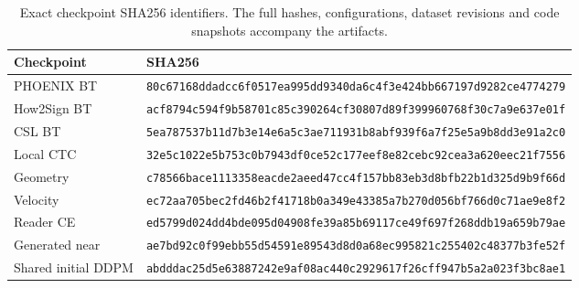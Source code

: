 \begin{table}[t]\centering\small
\caption{Exact checkpoint SHA256 identifiers. The full hashes, configurations, dataset revisions and code snapshots accompany the artifacts.}\label{tab:hashes}
\begin{tabular}{ll}\toprule
Checkpoint & SHA256\\\midrule
PHOENIX BT & \texttt{80c67168ddadcc6f0517ea995dd9340da6c4f3e424bb667197d9282ce4774279}\\
How2Sign BT & \texttt{acf8794c594f9b58701c85c390264cf30807d89f399960768f30c7a9e637e01f}\\
CSL BT & \texttt{5ea787537b11d7b3e14e6a5c3ae711931b8abf939f6a7f25e5a9b8dd3e91a2c0}\\
Local CTC & \texttt{32e5c1022e5b753c0b7943df0ce52c177eef8e82cebc92cea3a620eec21f7556}\\
Geometry & \texttt{c78566bace1113358eacde2aeed47cc4f157bb83eb3d8bfb22b1d325d9b9f66d}\\
Velocity & \texttt{ec72aa705bec2fd46b2f41718b0a349e43385a7b270d056bf766d0c71ae9e8f2}\\
Reader CE & \texttt{ed5799d024dd4bde095d04908fe39a85b69117ce49f697f268ddb19a659b79ae}\\
Generated near & \texttt{ae7bd92c0f99ebb55d54591e89543d8d0a68ec995821c255402c48377b3fe52f}\\
Shared initial DDPM & \texttt{abdddac25d5e63887242e9af08ac440c2929617f26cff947b5a2a023f3bc8ae1}\\
\bottomrule\end{tabular}\end{table}
